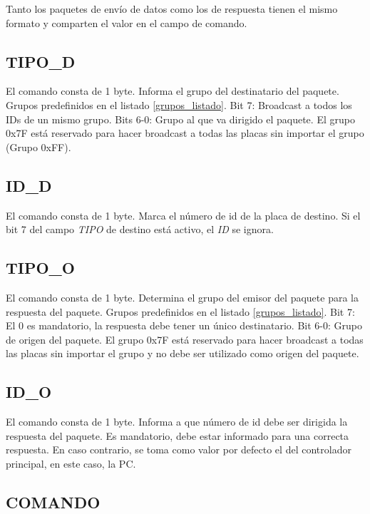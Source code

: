 \documentclass[a4paper,10pt]{article}
\begin{document}
Tanto los paquetes de env\'io de datos como los de respuesta tienen el mismo formato y comparten el valor en el campo de comando.

\subsection{TIPO\_D}
\label{tipo_destinatario}

	El comando consta de 1 byte.
	Informa el grupo del destinatario del paquete.
	Grupos predefinidos en el listado \ref{grupos_listado}.
	Bit 7: Broadcast a todos los IDs de un mismo grupo.
	Bits 6-0: Grupo al que va dirigido el paquete. El grupo 0x7F est\'a reservado para hacer broadcast a todas las placas sin importar el grupo (Grupo 0xFF).

\subsection{ID\_D}
\label{id_destinatario}

	El comando consta de 1 byte.
	Marca el n\'umero de id de la placa de destino.
	Si el bit 7 del campo \emph{TIPO} de destino est\'a activo, el \emph{ID} se ignora.

\subsection{TIPO\_O}
\label{tipo_emisor}

	El comando consta de 1 byte.
	Determina el grupo del emisor del paquete para la respuesta del paquete.
	Grupos predefinidos en el listado \ref{grupos_listado}.
	Bit 7: El 0 es mandatorio, la respuesta debe tener un \'unico destinatario.
	Bit 6-0: Grupo de origen del paquete.
	El grupo 0x7F est\'a reservado para hacer broadcast a todas las placas sin importar el grupo y no debe ser utilizado como origen del paquete.

\subsection{ID\_O}
\label{id_emisor}

	El comando consta de 1 byte.
	Informa a que n\'umero de id debe ser dirigida la respuesta del paquete.
	Es mandatorio, debe estar informado para una correcta respuesta.
	En caso contrario, se toma como valor por defecto el del controlador principal, en este caso, la PC.
		
\subsection{COMANDO}
\label{comando}
\end{document}
